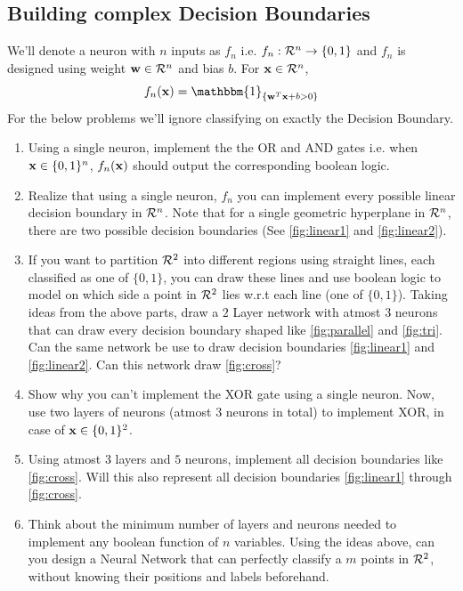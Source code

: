 \subsection{Building complex Decision Boundaries}
We'll denote a neuron with $n$ inputs as $f_n$ i.e. $f_n:\mathcal{R}^n \to \{0, 1\}$ and $f_n$ is designed using weight $\mathbf{w} \in \mathcal{R}^n$ and bias $b$. For $\mathbf{x} \in \mathcal{R}^n$,
\begin{equation*}
f_n(\mx) = \mathbbm{1}_{\{\wb^T\mx + b > 0\}}
\end{equation*}
For the below problems we'll ignore classifying on exactly the Decision Boundary.

\begin{enumerate}[label=\alph*)]
\item Using a single neuron, implement the the OR and AND gates i.e. when $\mathbf{x} \in \{0, 1\}^n$, $f_n(\mathbf{x})$ should output the corresponding boolean logic.



\item Realize that using a single neuron, $f_n$ you can implement every possible linear decision boundary in $\mathcal{R}^n$. Note that for a single geometric hyperplane in $\mathcal{R}^n$, there are two possible decision boundaries (See \autoref{fig:linear1} and \autoref{fig:linear2}).

\item If you want to partition $\mathcal{R}^2$ into different regions using straight lines, each classified as one of $\{0, 1\}$, you can draw these lines and use boolean logic to model on which side a point in $\mathcal{R}^2$ lies w.r.t each line (one of $\{0, 1\}$). Taking ideas from the above parts, draw a $2$ Layer network with atmost $3$ neurons that can draw every decision boundary shaped like \autoref{fig:parallel} and \autoref{fig:tri}. Can the same network be use to draw decision boundaries \autoref{fig:linear1} and \autoref{fig:linear2}. Can this network draw \autoref{fig:cross}?


\item Show why you can't implement the XOR gate using a single neuron. Now, use two layers of neurons (atmost $3$ neurons in total) to implement XOR, in case of $\mathbf{x} \in \{0, 1\}^2$.

\item Using atmost $3$ layers and $5$ neurons, implement all decision boundaries like \autoref{fig:cross}. Will this also represent all decision boundaries \autoref{fig:linear1} through \autoref{fig:cross}.

\item Think about the minimum number of layers and neurons needed to implement any boolean function of $n$ variables. Using the ideas above, can you design a Neural Network that can perfectly classify a $m$ points in $\mathcal{R}^2$, without knowing their positions and labels beforehand.
\end{enumerate}

